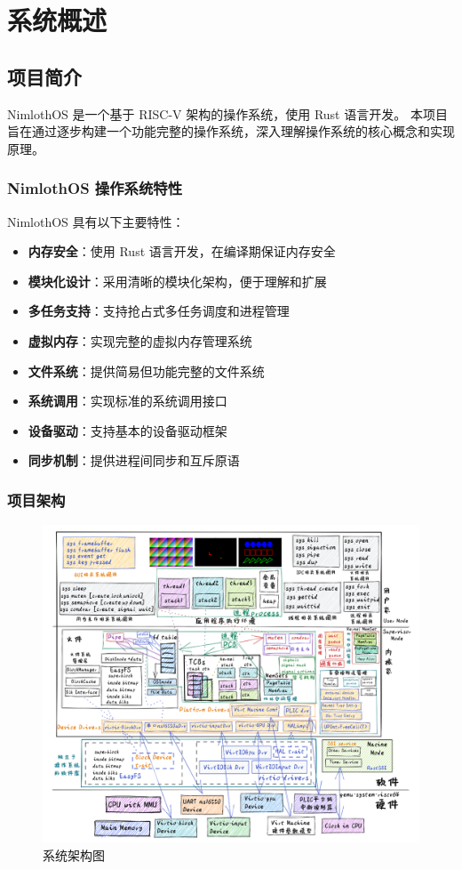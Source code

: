 \chapter{系统概述}

\section{项目简介}

NimlothOS 是一个基于 RISC-V 架构的操作系统，使用 Rust 语言开发。
本项目旨在通过逐步构建一个功能完整的操作系统，深入理解操作系统的核心概念和实现原理。

\subsection{NimlothOS 操作系统特性}

NimlothOS 具有以下主要特性：

\begin{itemize}
    \item \textbf{内存安全}：使用 Rust 语言开发，在编译期保证内存安全
    \item \textbf{模块化设计}：采用清晰的模块化架构，便于理解和扩展
    \item \textbf{多任务支持}：支持抢占式多任务调度和进程管理
    \item \textbf{虚拟内存}：实现完整的虚拟内存管理系统
    \item \textbf{文件系统}：提供简易但功能完整的文件系统
    \item \textbf{系统调用}：实现标准的系统调用接口
    \item \textbf{设备驱动}：支持基本的设备驱动框架
    \item \textbf{同步机制}：提供进程间同步和互斥原语
\end{itemize}

\subsection{项目架构}

\begin{figure}[htbp]
    \centering
    \includegraphics[width=1.0\textwidth]{../image/Architecture.png}
    \caption{系统架构图}
    \label{fig:architecture}
\end{figure}
